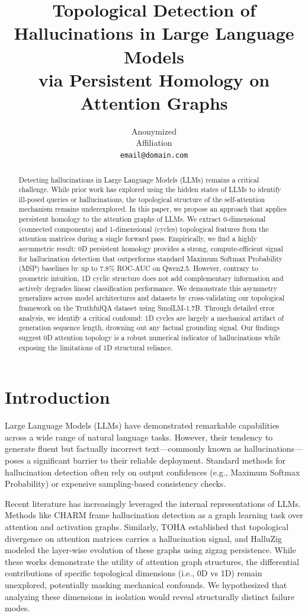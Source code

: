 \documentclass[11pt,a4paper]{article}
\title{Topological Detection of Hallucinations in Large Language Models \\ via Persistent Homology on Attention Graphs}
\author{Anonymized \\ Affiliation \\ \texttt{email@domain.com}}
\begin{document}
\maketitle

\begin{abstract}
Detecting hallucinations in Large Language Models (LLMs) remains a critical challenge. While prior work has explored using the hidden states of LLMs to identify ill-posed queries or hallucinations, the topological structure of the self-attention mechanism remains underexplored. In this paper, we propose an approach that applies persistent homology to the attention graphs of LLMs. We extract 0-dimensional (connected components) and 1-dimensional (cycles) topological features from the attention matrices during a single forward pass. Empirically, we find a highly asymmetric result: 0D persistent homology provides a strong, compute-efficient signal for hallucination detection that outperforms standard Maximum Softmax Probability (MSP) baselines by up to 7.8\% ROC-AUC on Qwen2.5. However, contrary to geometric intuition, 1D cyclic structure does not add complementary information and actively degrades linear classification performance. We demonstrate this asymmetry generalizes across model architectures and datasets by cross-validating our topological framework on the TruthfulQA dataset using SmolLM-1.7B. Through detailed error analysis, we identify a critical confound: 1D cycles are largely a mechanical artifact of generation sequence length, drowning out any factual grounding signal. Our findings suggest 0D attention topology is a robust numerical indicator of hallucinations while exposing the limitations of 1D structural reliance.
\end{abstract}

\section{Introduction}
Large Language Models (LLMs) have demonstrated remarkable capabilities across a wide range of natural language tasks. However, their tendency to generate fluent but factually incorrect text---commonly known as hallucinations---poses a significant barrier to their reliable deployment. Standard methods for hallucination detection often rely on output confidences (e.g., Maximum Softmax Probability) or expensive sampling-based consistency checks.

Recent literature has increasingly leveraged the internal representations of LLMs. Methods like CHARM \citep{charm} frame hallucination detection as a graph learning task over attention and activation graphs. Similarly, TOHA \citep{toha} established that topological divergence on attention matrices carries a hallucination signal, and HalluZig \citep{halluzig} modeled the layer-wise evolution of these graphs using zigzag persistence. While these works demonstrate the utility of attention graph structures, the differential contributions of specific topological dimensions (i.e., 0D vs 1D) remain unexplored, potentially masking mechanical confounds. We hypothesized that analyzing these dimensions in isolation would reveal structurally distinct failure modes.
\end{document}
